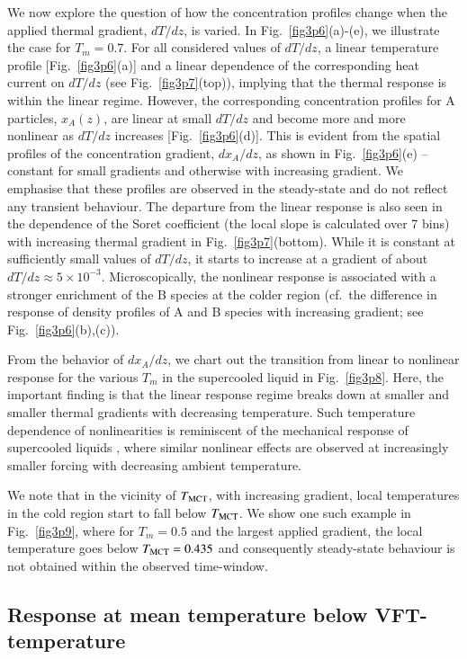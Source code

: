 We now explore the question of how the concentration profiles change when the applied thermal gradient, $dT/dz$, is varied. In Fig.~\ref{fig3p6}(a)-(e), we illustrate the case for $T_m=0.7$.  For all considered values of $dT/dz$, a linear temperature profile [Fig.~\ref{fig3p6}(a)] and a linear dependence of the corresponding heat current on $dT/dz$ (see Fig.~\ref{fig3p7}(top)), implying that the thermal response is within the linear regime.  However, the corresponding concentration profiles for A particles, $x_A(z)$, are linear at small $dT/dz$ and become more and more nonlinear as $dT/dz$ increases [Fig.~\ref{fig3p6}(d)]. This is evident from the spatial profiles of the concentration gradient, $d{x_A}/dz$, as shown in Fig.~\ref{fig3p6}(e) -- constant for small gradients and otherwise with increasing gradient.  We emphasise that these profiles are observed in the steady-state and do not reflect any transient behaviour. The departure from the linear response is also seen in the dependence of the Soret coefficient (the local slope is calculated over 7 bins) with increasing thermal gradient in Fig.~\ref{fig3p7}(bottom). While it is constant at sufficiently small values of $dT/dz$, it starts to increase at a gradient of about $dT/dz\approx 5\times 10^{-3}$. Microscopically, the nonlinear response is associated with a stronger enrichment of the B species at the colder region (cf.~the difference in response of density profiles of A and B species with increasing gradient; see Fig.~\ref{fig3p6}(b),(c)).

From the behavior of $d{x_A}/dz$, we chart out the transition from linear to nonlinear response for the various $T_m$ in the supercooled liquid in Fig.~\ref{fig3p8}.  Here, the important finding is that the linear response regime breaks down at smaller and smaller thermal gradients with decreasing temperature.  Such temperature dependence of nonlinearities is reminiscent of the mechanical response of supercooled liquids \cite{ludo,zausch}, where similar nonlinear effects are observed at increasingly smaller forcing with decreasing ambient temperature.

{We note that in the vicinity of $T_{\rm MCT}$, with increasing gradient, local temperatures in the cold region start to fall below $T_{\rm MCT}$. We show one such example in Fig.~\ref{fig3p9}, where for $T_m=0.5$ and the largest applied gradient, the local temperature goes below $T_{\rm MCT}=0.435$ and consequently steady-state behaviour is not obtained within the observed time-window.}

%
\subsection{Response at mean temperature below VFT-temperature}

